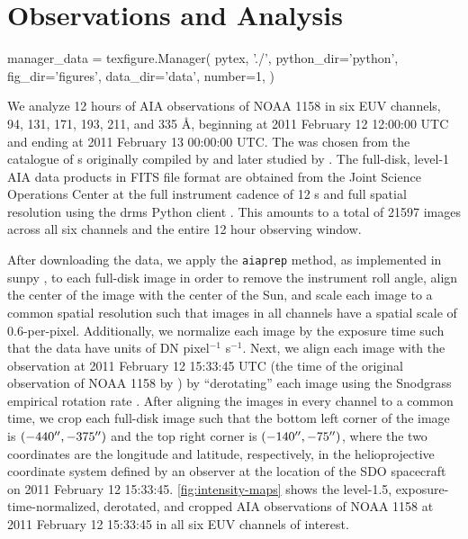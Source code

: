 \section{Observations and Analysis}\label{sec:observations}
\begin{pycode}
manager_data = texfigure.Manager(
    pytex, './',
    python_dir='python',
    fig_dir='figures',
    data_dir='data',
    number=1,
)
\end{pycode}

We analyze 12 hours of AIA observations of \AR{} NOAA 1158 in six EUV channels, 94, 131, 171, 193, 211, and 335 \AA{}, beginning at 2011 February 12 12:00:00 UTC and ending at 2011 February 13 00:00:00 UTC.
The \AR{} was chosen from the catalogue of \AR s originally compiled by \citet{warren_systematic_2012} and later studied by .
The full-disk, level-1 AIA data products in FITS file format are obtained from the Joint Science Operations Center \citep[JSOC,][]{couvidat_observables_2016} at the full instrument cadence of 12 s and full spatial resolution using the drms Python client \citep{glogowski_drms_2019}.
This amounts to a total of 21597 images across all six channels and the entire 12 hour observing window.

After downloading the data, we apply the \texttt{aiaprep} method, as implemented in sunpy \citep{the_sunpy_community_sunpy_2020}, to each full-disk image in order to remove the instrument roll angle, align the center of the image with the center of the Sun, and scale each image to a common spatial resolution such that images in all channels have a spatial scale of 0.6\arcsec-per-pixel.
Additionally, we normalize each image by the exposure time such that the data have units of DN pixel$^{-1}$ s$^{-1}$.
Next, we align each image with the observation at 2011 February 12 15:33:45 UTC (the time of the original observation of NOAA 1158 by \citet{warren_systematic_2012}) by ``derotating'' each image using the Snodgrass empirical rotation rate \citep{snodgrass_magnetic_1983}.
After aligning the images in every channel to a common time, we crop each full-disk image such that the bottom left corner of the image is $(-440\mbox{$^{\prime\prime}$},-375\mbox{$^{\prime\prime}$})$ and the top right corner is $(-140\mbox{$^{\prime\prime}$},-75\mbox{$^{\prime\prime}$})$, where the two coordinates are the longitude and latitude, respectively, in the helioprojective coordinate system \citep[see][]{thompson_coordinate_2006} defined by an observer at the location of the SDO spacecraft on 2011 February 12 15:33:45.
\autoref{fig:intensity-maps} shows the level-1.5, exposure-time-normalized, derotated, and cropped AIA observations of \AR{} NOAA 1158 at 2011 February 12 15:33:45 in all six EUV channels of interest.

